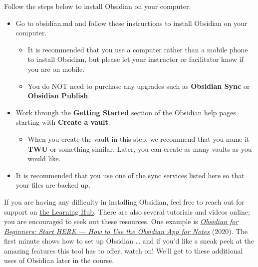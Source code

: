 \documentclass[
  letterpaper,
  DIV=11,
  numbers=noendperiod]{scrreprt}
\providecommand{\tightlist}{%
  \setlength{\itemsep}{0pt}\setlength{\parskip}{0pt}}\usepackage{longtable,booktabs,array}
\begin{document}
\begin{tcolorbox}[enhanced jigsaw, toprule=.15mm, colback=white, colframe=quarto-callout-note-color-frame, bottomtitle=1mm, leftrule=.75mm, coltitle=black, titlerule=0mm, rightrule=.15mm, colbacktitle=quarto-callout-note-color!10!white, left=2mm, title={Learning Activity}, opacitybacktitle=0.6, opacityback=0, breakable, toptitle=1mm, arc=.35mm, bottomrule=.15mm]

Follow the steps below to install Obsidian on your computer.

\begin{itemize}
\tightlist
\item
  Go to obsidian.md and follow these instructions to install Obsidian on
  your computer.

  \begin{itemize}
  \tightlist
  \item
    It is recommended that you use a computer rather than a mobile phone
    to install Obsidian, but please let your instructor or facilitator
    know if you are on mobile.
  \item
    You do NOT need to purchase any upgrades such as \textbf{Obsidian
    Sync} or \textbf{Obsidian Publish}.
  \end{itemize}
\item
  Work through the \textbf{Getting Started} section of the Obsidian help
  pages starting with \textbf{Create a vault}.

  \begin{itemize}
  \tightlist
  \item
    When you create the vault in this step, we recommend that you name
    it \textbf{TWU} or something similar. Later, you can create as many
    vaults as you would like.
  \end{itemize}
\item
  It is recommended that you use one of the sync services listed here so
  that your files are backed up.
\end{itemize}

If you are having any difficulty in installing Obsidian, feel free to
reach out for support on
\href{https://twu.discourse.group/c/ldrs101/10}{the Learning Hub}. There
are also several tutorials and videos online; you are encouraged to seek
out these resources. One example is
\href{https://www.youtube-nocookie.com/embed/QgbLb6QCK88?si=ZKdRBBIccDy4TjgY}{\emph{Obsidian
for Beginners: Start HERE --- How to Use the Obsidian App for Notes}}
(2020). The first minute shows how to set up Obsidian \ldots{} and if
you'd like a sneak peek at the amazing features this tool has to offer,
watch on! We'll get to these additional uses of Obsidian later in the
course.

\end{tcolorbox}
\end{document}
